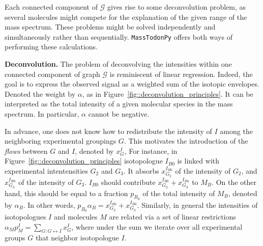 \documentclass[journal=ancham, manuscript=article, layout=twocolumn]{achemso}
\begin{document}
Each connected component of $\mathcal{G}$ gives rise to some deconvolution problem, as several molecules might compete for the explanation of the given range of the mass spectrum. 
These problems might be solved independently and simultaneously rather than sequentially. 
{\tt MassTodonPy} offers both ways of performing these calculations.



\noindent\textbf{Deconvolution.} 
The problem of deconvolving the intensities within one connected component of graph $\mathcal{G}$ is reminiscent of linear regression.
Indeed, the goal is to express the observed signal as a weighted sum of the isotopic envelopes. 
Denoted the weight by $\alpha$, as in Figure~\ref{fig::deconvolution_principles}. 
It can be interpreted as the total intensity of a given molecular species in the mass spectrum. 
In particular, $\alpha$ cannot be negative.

In advance, one does not know how to redistribute the intensity of $I$ among the neighboring experimental groupings $G$. 
This motivates the introduction of the \textit{flows} between $G$ and $I$, denoted by $x_G^I$, 
For instance, in Figure~\ref{fig::deconvolution_principles} isotopologue $I_{B0}$ is linked with experimental intentensities $G_2$ and $G_3$. 
It absorbs $x_{G_2}^{I_{B0}}$ of the intensity of $G_2$, and $x_{G_3}^{I_{B0}}$ of the intensity of $G_3$. 
$I_{B0}$ should contribute $x_{G_2}^{I_{B0}} + x_{G_3}^{I_{B0}}$ to $M_B$.
On the other hand, this should be equal to a fraction $p_{B_0}$ of the total intensity of $M_B$, denoted by $\alpha_B$. 
In other words, $p_{B_0} \alpha_B = x_{G_2}^{I_{B0}} + x_{G_3}^{I_{B0}}$.
Similarly, in general the intensities of isotopologues $I$ and molecules $M$ are related via a set of linear restrictions $\alpha_M p_M^I = \sum_{G: G \leftrightarrow I} x^I_G$, where under the sum we iterate over all experimental groups $G$ that neighbor isotopologue $I$. 
\end{document}
